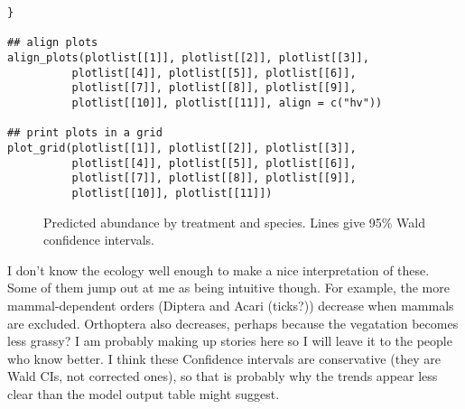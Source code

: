 \documentclass[11pt]{article}
\begin{document}
\begin{verbatim}
}

## align plots
align_plots(plotlist[[1]], plotlist[[2]], plotlist[[3]],
          plotlist[[4]], plotlist[[5]], plotlist[[6]],
          plotlist[[7]], plotlist[[8]], plotlist[[9]],
          plotlist[[10]], plotlist[[11]], align = c("hv"))

## print plots in a grid
plot_grid(plotlist[[1]], plotlist[[2]], plotlist[[3]],
          plotlist[[4]], plotlist[[5]], plotlist[[6]],
          plotlist[[7]], plotlist[[8]], plotlist[[9]],
          plotlist[[10]], plotlist[[11]])
\end{verbatim}

\begin{figure}[htbp]
\centering

\caption{Predicted abundance by treatment and species. Lines give 95\% Wald confidence intervals.}
\end{figure}

I don't know the ecology well enough to make a nice interpretation of these. Some of them jump out at me as being intuitive though. For example, the more mammal-dependent orders (Diptera and Acari (ticks?)) decrease when mammals are excluded. Orthoptera also decreases, perhaps because the vegatation becomes less grassy? I am probably making up stories here so I will leave it to the people who know better. I think these Confidence intervals are conservative (they are Wald CIs, not corrected ones), so that is probably why the trends appear less clear than the model output table might suggest.
\end{document}
